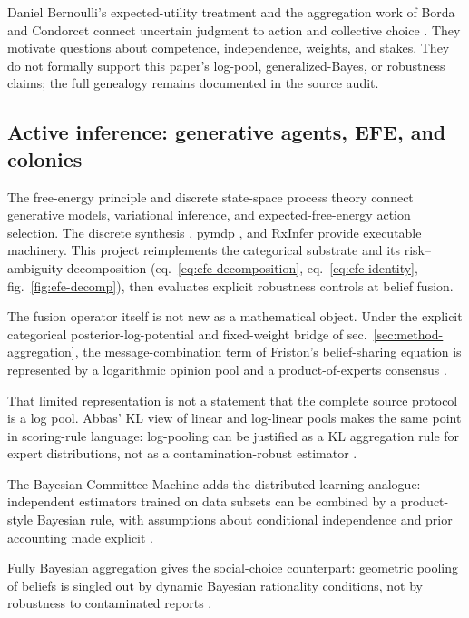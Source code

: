 \documentclass[
  english,
]{article}
\theoremstyle{plain}
\theoremstyle{definition}
\theoremstyle{remark}
\theoremstyle{definition}
\begin{document}
Daniel Bernoulli's expected-utility treatment and the aggregation work
of Borda and Condorcet connect uncertain judgment to action and
collective choice
\citep{bernoulli1738mensura, borda1784elections, condorcet1785essai}.
They motivate questions about competence, independence, weights, and
stakes. They do not formally support this paper's log-pool,
generalized-Bayes, or robustness claims; the full genealogy remains
documented in the source audit.

\subsection{Active inference: generative agents, EFE, and
colonies}\label{sec:related-aif}

The free-energy principle \citep{friston2010free} and discrete
state-space process theory \citep{friston2017active} connect generative
models, variational inference, and expected-free-energy action
selection. The discrete synthesis \citep{dacosta2020active}, pymdp
\citep{heins2022pymdp}, and RxInfer \citep{bagaev2023rxinfer} provide
executable machinery. This project reimplements the categorical
substrate and its risk--ambiguity decomposition
(eq.~\ref{eq:efe-decomposition}, eq.~\ref{eq:efe-identity},
fig.~\ref{fig:efe-decomp}), then evaluates explicit robustness controls
at belief fusion.

The fusion operator itself is not new as a mathematical object. Under
the explicit categorical posterior-log-potential and fixed-weight bridge
of sec.~\ref{sec:method-aggregation}, the message-combination term of
Friston's belief-sharing equation is represented by a logarithmic
opinion pool \citep{genest1986combining, genest1986externally} and a
product-of-experts consensus \citep{hinton2002products}.

That limited representation is not a statement that the complete source
protocol is a log pool. Abbas' KL view of linear and log-linear pools
makes the same point in scoring-rule language: log-pooling can be
justified as a KL aggregation rule for expert distributions, not as a
contamination-robust estimator \citep{abbas2009kullback}.

The Bayesian Committee Machine adds the distributed-learning analogue:
independent estimators trained on data subsets can be combined by a
product-style Bayesian rule, with assumptions about conditional
independence and prior accounting made explicit
\citep{tresp2000bayesian}.

Fully Bayesian aggregation gives the social-choice counterpart:
geometric pooling of beliefs is singled out by dynamic Bayesian
rationality conditions, not by robustness to contaminated reports
\citep{dietrich2021fully}.
\end{document}
